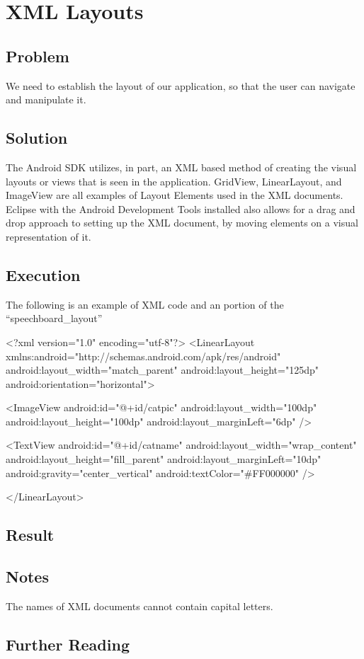 \section{XML Layouts} %
\subsection*{Problem}
We need to establish the layout of our application, so that the user can navigate and manipulate it.
\subsection*{Solution}
The Android SDK utilizes, in part, an XML based method of creating the visual layouts or views that is seen in the application.
GridView, LinearLayout, and ImageView are all examples of Layout Elements used in the XML documents.
Eclipse with the Android Development Tools installed also allows for a drag and drop approach to setting up the XML document, by moving elements on a visual representation of it.

\subsection*{Execution}
The following is an example of XML code and an portion of the ``speechboard_layout''
\begin{source}{}
<?xml version="1.0" encoding="utf-8"?>
<LinearLayout xmlns:android="http://schemas.android.com/apk/res/android"
    android:layout_width="match_parent"
    android:layout_height="125dp"
    android:orientation="horizontal">

    <ImageView
        android:id="@+id/catpic"
        android:layout_width="100dp"
        android:layout_height="100dp"
        android:layout_marginLeft="6dp" />

    <TextView
        android:id="@+id/catname"
        android:layout_width="wrap_content"
        android:layout_height="fill_parent"
        android:layout_marginLeft="10dp"
        android:gravity="center_vertical"
        android:textColor="#FF000000" />

</LinearLayout>
\end{source}


\subsection*{Result}

\subsection*{Notes}
The names of XML documents cannot contain capital letters.

\subsection*{Further Reading}
